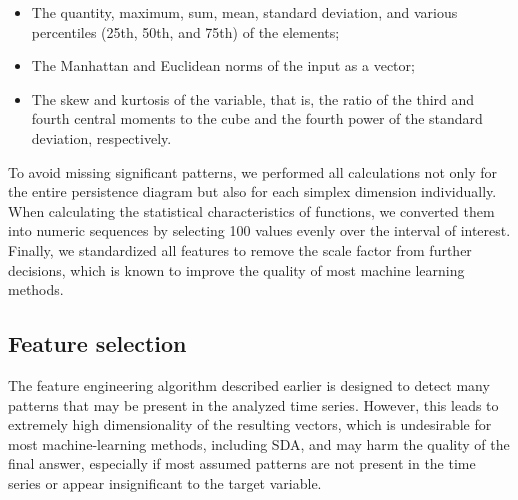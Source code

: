 \documentclass[shortAfour,times,sagev]{sagej}
\begin{document}
\begin{itemize}
    \item 
The quantity, maximum, sum, mean, standard deviation, and various percentiles (25th, 50th, and 75th) of the elements;
    \item 
        The Manhattan and Euclidean norms of the input as a vector;
    \item 
The skew and kurtosis of the variable, that is, the ratio of the third and fourth central moments to the cube and the fourth power of the standard deviation, respectively.
\end{itemize}

To avoid missing significant patterns, we performed all calculations not only for the entire persistence diagram but also for each simplex dimension individually. When calculating the statistical characteristics of functions, we converted them into numeric sequences by selecting 100 values evenly over the interval of interest. Finally, we standardized all features to remove the scale factor from further decisions, which is known to improve the quality of most machine learning methods.


\subsection{Feature selection}

The feature engineering algorithm described earlier is designed to detect many patterns that may be present in the analyzed time series. However, this leads to extremely high dimensionality of the resulting vectors, which is undesirable for most machine-learning methods, including SDA, and may harm the quality of the final answer, especially if most assumed patterns are not present in the time series or appear insignificant to the target variable.
\end{document}
